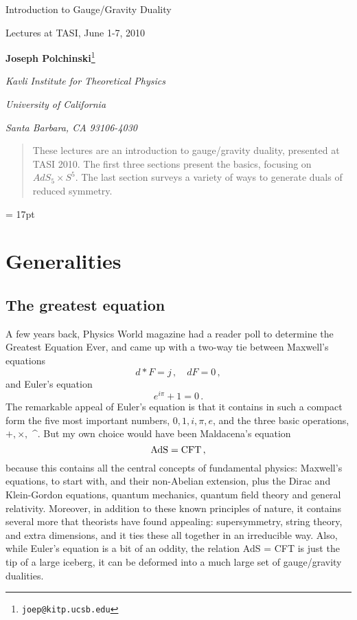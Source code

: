 \documentclass[12pt]{article}
\newcommand{\sect}[1]{\section{#1}\setcounter{equation}{0}}
\begin{document}

\begin{titlepage}
\bigskip
\bigskip\bigskip\bigskip
\centerline{\Large Introduction to Gauge/Gravity Duality}
\medskip
\centerline{\large Lectures at TASI, June 1-7, 2010}
\bigskip\bigskip\bigskip
\bigskip\bigskip\bigskip

 \centerline{ {\bf Joseph Polchinski}\footnote{\tt joep@kitp.ucsb.edu}}
\medskip
\centerline{\em Kavli Institute for Theoretical Physics}
\centerline{\em University of California}
\centerline{\em Santa Barbara, CA 93106-4030}\bigskip
\bigskip
\bigskip\bigskip



\begin{abstract}
These lectures are an introduction to gauge/gravity duality, presented at TASI 2010.  The first three sections present the basics, focusing on $AdS_5 \times S^5$.  The last section surveys a variety of ways to generate duals of reduced symmetry.
\end{abstract}
\end{titlepage}
\baselineskip = 17pt
\setcounter{footnote}{0}

\tableofcontents

\sect{Generalities}

\subsection{The greatest equation}

A few years back, Physics World magazine had a reader poll to determine the Greatest Equation Ever, and came up with a two-way tie between Maxwell's equations
\begin{equation}
d*F=j\,,\quad dF=0\,,
\end{equation}             
and Euler's equation
\begin{equation}
e^{i\pi} + 1 = 0 \,.
\end{equation}             
The remarkable appeal of Euler's equation is that it contains in such a compact form the five most important numbers, $0, 1, i, \pi, e$, and the three basic operations, $+, \times,$ \^{}.  But my own choice would have been Maldacena's equation
\begin{equation}
{\rm AdS} = {\rm CFT} \,,
\end{equation}
because this contains all the central concepts of fundamental physics: Maxwell's equations, to start with, and their non-Abelian extension, plus the Dirac and Klein-Gordon equations, quantum mechanics, quantum field theory and general relativity.  Moreover, in addition to these known principles of nature, it contains several more that theorists have found appealing: supersymmetry, string theory, and extra dimensions, and it ties these all together in an irreducible way.  Also, while Euler's equation is a bit of an oddity, the relation AdS = CFT is just the tip of a large iceberg, it can be deformed into a much large set of gauge/gravity dualities.
\end{document}
